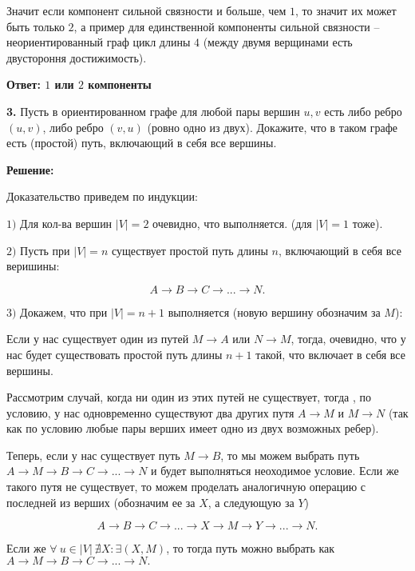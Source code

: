 \documentclass[a4paper,12pt]{article} %
\begin{document}
Значит если компонент сильной связности и больше, чем $1$, то значит их может быть только $2$, а пример для единственной компоненты сильной связности -- неориентированный граф цикл длины $4$ (между двумя верщинами есть двустороння достижимость).

\begin{flushright}
\begin{large}
\textbf {Ответ: $1$ или $2$ компоненты}
\end{large}
\end{flushright}

{\bf 3.} Пусть в ориентированном графе для любой пары вершин $u, v$ есть
либо ребро $(u, v)$, либо ребро $(v, u)$ (ровно одно из двух). Докажите, что
в таком графе есть (простой) путь, включающий в себя все вершины.
\begin{center}
\bfseries
{\Large Решение: }
\end{center}

Доказательство приведем по индукции:

$1)$ Для кол-ва вершин $|V| = 2$ очевидно, что выполняется. (для $|V| = 1$ тоже).

$2)$ Пусть при $|V| = n$ существует простой путь длины $n$, включающий в себя все веришины:

\[ A\rightarrow B \rightarrow C \rightarrow ... \rightarrow N.\]

$3)$ Докажем, что при $|V| = n + 1$  выполняется (новую вершину обозначим за $M$):

Если у нас существует один из путей $M \rightarrow A$ или $N \rightarrow M$, тогда, очевидно, что у нас будет существовать простой путь длины $n+1$ такой, что включает в себя все вершины.

Рассмотрим случай, когда ни один из этих путей не существует, тогда , по условию, у нас одновременно существуют два других путя $A\rightarrow M$ и $M \rightarrow N$ (так как по условию любые пары верших имеет одно из двух возможных ребер).

Теперь, если у нас существует путь $M \rightarrow B$, то мы можем выбрать путь $A\rightarrow M \rightarrow B \rightarrow C \rightarrow ... \rightarrow N$ и будет выполняться неоходимое условие. Если же такого путя не существует, то можем проделать аналогичную операцию с последней из верших (обозначим ее за $X$, а следующую за $Y$) 

\[ A\rightarrow B \rightarrow C \rightarrow ...\rightarrow X \rightarrow M \rightarrow Y \rightarrow...\rightarrow N.  \]

Если же $\forall\ u \in |V|\ \nexists X : \exists (X,M)$, то тогда путь можно выбрать как $ A\rightarrow M \rightarrow B \rightarrow C \rightarrow ... \rightarrow N.$ 
\end{document}
